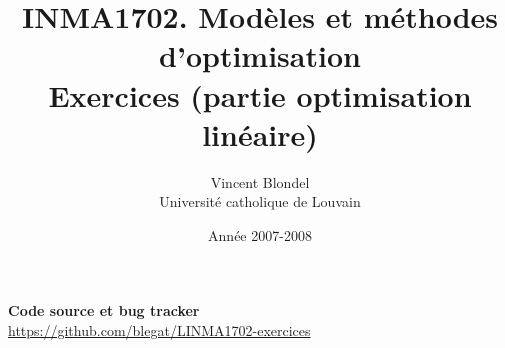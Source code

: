 \documentclass[11pt]{article}
\author{Vincent Blondel\\
Université catholique de Louvain}
\title{INMA1702. Mod\`eles et m\'ethodes d'optimisation
  \\
Exercices (partie optimisation linéaire)}
\begin{document}
\date{Année 2007-2008}

\maketitle

\begin{center}
\textbf{Code source et bug tracker}\\
\url{https://github.com/blegat/LINMA1702-exercices}
\end{center}

\newpage


\tableofcontents

\newpage




\newpage




\newpage




\newpage




\newpage




\newpage




\newpage



\end{document}
